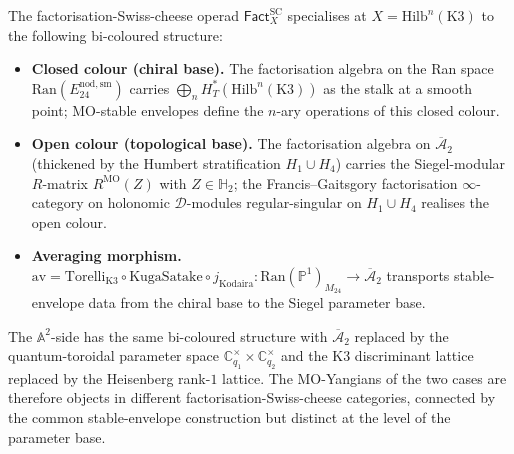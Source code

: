 \begin{remark}
\label{rem:fsc-K3-hilb-swiss-cheese}
The factorisation-Swiss-cheese operad $\mathsf{Fact}^{\mathrm{SC}}_X$
specialises at $X = \mathrm{Hilb}^n(\mathrm K3)$ to the following
bi-coloured structure:
\begin{itemize}
\item \textbf{Closed colour (chiral base).} The factorisation algebra
 on the Ran space $\mathrm{Ran}(E^{\mathrm{nod,sm}}_{24})$ carries
 $\bigoplus_n H^*_T(\mathrm{Hilb}^n(\mathrm K3))$ as the stalk at a
 smooth point; MO-stable envelopes define the $n$-ary operations of
 this closed colour.
\item \textbf{Open colour (topological base).} The factorisation
 algebra on $\overline{\mathcal A}_2$ (thickened by the Humbert
 stratification $H_1 \cup H_4$) carries the Siegel-modular
 $R$-matrix $R^{\mathrm{MO}}(Z)$ with $Z \in \mathbb H_2$; the
 Francis--Gaitsgory factorisation $\infty$-category on holonomic
 $\mathcal D$-modules regular-singular on $H_1 \cup H_4$ realises
 the open colour.
\item \textbf{Averaging morphism.} $\mathrm{av} = \mathrm{Torelli}_{\mathrm K3}
 \circ \mathrm{KugaSatake} \circ j_{\mathrm{Kodaira}} \colon
 \mathrm{Ran}(\mathbb P^1)_{M_{24}} \to \overline{\mathcal A}_2$
 transports stable-envelope data from the chiral base to the Siegel
 parameter base.
\end{itemize}
The $\mathbb A^2$-side has the same bi-coloured structure with
$\overline{\mathcal A}_2$ replaced by the quantum-toroidal parameter
space $\mathbb{C}^\times_{q_1} \times \mathbb{C}^\times_{q_2}$ and
the K3 discriminant lattice replaced by the Heisenberg rank-$1$
lattice. The MO-Yangians of the two cases are therefore objects in
different factorisation-Swiss-cheese categories, connected by the
common stable-envelope construction but distinct at the level of the
parameter base.
\end{remark}

